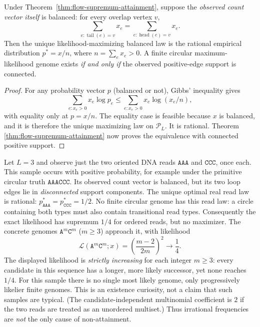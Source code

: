 \begin{proposition}
\label{prop:balanced-sample-attainment}
Under Theorem~\ref{thm:flow-supremum-attainment}, suppose
the \emph{observed count vector itself} is balanced:
for every overlap vertex $v$,
\[
 \sum_{e:\operatorname{tail}(e)=v}x_e
 =\sum_{e:\operatorname{head}(e)=v}x_e.
\]
Then the unique likelihood-maximizing balanced law is
the rational empirical distribution $p^*=x/n$, where
$n=\sum_e x_e>0$. A finite circular maximum-likelihood
genome exists \emph{if and only if} the observed
positive-edge support is connected.
\end{proposition}
\begin{proof}
For any probability vector $p$ (balanced or not),
Gibbs' inequality gives
\[
 \sum_{e:x_e>0}x_e\log p_e
 \le\sum_{e:x_e>0}x_e\log(x_e/n),
\]
with equality only at $p=x/n$. The equality case
is feasible because $x$ is balanced, and it is
therefore the unique maximizing law on
$\mathcal P_L$. It is rational. Theorem~
\ref{thm:flow-supremum-attainment} now proves
the equivalence with connected positive support.
\end{proof}

\begin{example}
\label{ex:unattained-disconnected}
Let $L=3$ and observe just the two oriented DNA
reads $\texttt{AAA}$ and $\texttt{CCC}$, once each.
This sample occurs with positive probability,
for example under the primitive circular truth
$\texttt{AAACCC}$. Its observed count vector is
balanced, but its two loop edges lie in
\emph{disconnected} support components. The unique
optimal real read law is rational:
$p^*_{\texttt{AAA}}=p^*_{\texttt{CCC}}=1/2$.
No finite circular genome has this read law:
a circle containing both types must also contain
transitional read types. Consequently the exact
likelihood has supremum $1/4$ for ordered reads,
but no maximizer. The concrete genomes
$\texttt{A}^m\texttt{C}^m$ ($m\ge3$)
approach it, with likelihood
\[
 \mathcal L(\texttt{A}^m\texttt{C}^m;x)
       =\left(\frac{m-2}{2m}\right)^2
       \longrightarrow\frac14.
\]
The displayed likelihood is \emph{strictly increasing} for
each integer $m\ge3$: every candidate in this sequence
has a longer, more likely successor, yet none reaches
$1/4$. For this sample there is no single most likely
genome, only progressively likelier finite genomes.
This is an existence curiosity, not a claim that such
samples are typical.
(The candidate-independent multinomial coefficient
is $2$ if the two reads are treated as an
unordered multiset.) Thus irrational frequencies
are \emph{not} the only cause of non-attainment.
\end{example}

